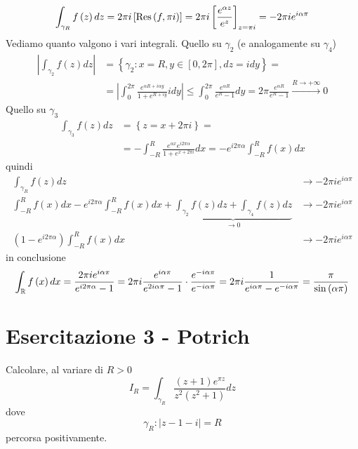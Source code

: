 \begin{equation*}
\int_{\gamma_{R}} f\left(z\right) dz = 2\pi i\left[\operatorname{Res} \left(f, \pi i\right)\right] = 2\pi i\left[\frac{e^{\alpha z}}{e^{z}}\right]_{z = \pi i} = - 2\pi ie^{i\alpha \pi}
\end{equation*}
Vediamo quanto valgono i vari integrali. Quello su $\gamma_{2}$ (e analogamente su $\gamma_{4}$)
\begin{align*}
\left| \int_{\gamma_{2}} f\left(z\right) dz\right|  & = \left\{\gamma_{2} :x = R, y\in \left[ 0, 2\pi \right], dz = idy\right\} = \\
 & = \left| \int^{2\pi}_{0}\frac{e^{\alpha R + i\alpha y}}{1 + e^{R + iy}} idy\right| \leq \int^{2\pi}_{0}\frac{e^{\alpha R}}{e^{R} - 1} dy = 2\pi \frac{e^{\alpha R}}{e^{R} - 1}\xrightarrow{R\rightarrow + \infty} 0
\end{align*}
Quello su $\gamma_{3}$
\begin{align*}
\int_{\gamma_{3}} f\left(z\right) dz & = \left\{z = x + 2\pi i\right\} = \\
 & = - \int^{R}_{- R}\frac{e^{\alpha x} e^{i2\pi \alpha}}{1 + e^{x + 2\pi i}} dx = -e^{i2\pi \alpha}\int^{R}_{- R} f\left(x\right) dx
\end{align*}
quindi
\begin{align*}
\int_{\gamma_{R}} f\left(z\right) dz & \rightarrow - 2\pi ie^{i\alpha \pi}\\
\int^{R}_{- R} f\left(x\right) dx - e^{i2\pi \alpha}\int^{R}_{- R} f\left(x\right) dx + \underbrace{\int_{\gamma_{2}} f\left(z\right) dz + \int_{\gamma_{4}} f\left(z\right) dz}_{\rightarrow 0} & \rightarrow - 2\pi ie^{i\alpha \pi}\\
\left(1 - e^{i2\pi \alpha}\right)\int^{R}_{- R} f\left(x\right) dx & \rightarrow - 2\pi ie^{i\alpha \pi}
\end{align*}
in conclusione
\begin{equation*}
\int_{\mathbb{R}} f\left(x\right) dx = \frac{2\pi ie^{i\alpha \pi}}{e^{i2\pi \alpha} - 1} = 2\pi i\frac{e^{i\alpha \pi}}{e^{2i\alpha \pi} - 1} \cdot \frac{e^{- i\alpha \pi}}{e^{- i\alpha \pi}} = 2\pi i\frac{1}{e^{i\alpha \pi} - e^{- i\alpha \pi}} = \frac{\pi}{\sin\left(\alpha \pi \right)}
\end{equation*}
\chapter{Esercitazione 3 - Potrich}
\ParteEsercizi
\Esercizio{}

Calcolare, al variare di $R > 0$
\begin{equation*}
I_{R} = \int_{\gamma_{R}}\frac{\left(z + 1\right) e^{\pi z}}{z^{2}\left(z^{2} + 1\right)} dz
\end{equation*}
dove
\begin{equation*}
\gamma_{R} :\left| z - 1 - i\right| = R
\end{equation*}
percorsa positivamente.
\Esercizio{}

